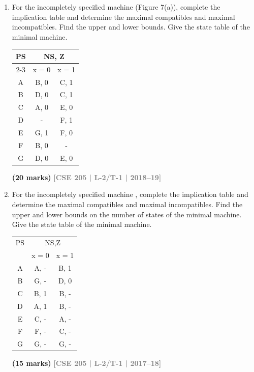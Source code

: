 \documentclass[12pt,a3paper]{article}
\newcommand{\yr}[1]{\hfill\textcolor{gray}{\small\textbf{[#1]}}}
\newcommand{\mk}[1]{\textcolor{orange!70!black}{\small\textbf{(#1 marks)}}}
\begin{document}
\begin{enumerate}
\mk{25} \yr{CSE 205 | L-2/T-1 | 2019--20}

\item For the incompletely specified machine (Figure 7(a)), complete the implication table and determine the maximal compatibles and maximal incompatibles. Find the upper and lower bounds. Give the state table of the minimal machine.

\begin{center}
  \begin{tabular}{|c|c|c|}
\hline
\multirow{2}{*}{PS} & \multicolumn{2}{c|}{NS, Z} \\ \cline{2-3} 
 & x = 0 & x = 1 \\ \hline
A & B, 0 & C, 1 \\ \hline
B & D, 0 & C, 1 \\ \hline
C & A, 0 & E, 0 \\ \hline
D & - & F, 1 \\ \hline
E & G, 1 & F, 0 \\ \hline
F & B, 0 & - \\ \hline
G & D, 0 & E, 0 \\ \hline
\end{tabular}
\end{center}

\mk{20} \yr{CSE 205 | L-2/T-1 | 2018--19}

\item For the incompletely specified machine , complete the implication table and determine the maximal compatibles and maximal incompatibles. Find the upper and lower bounds on the number of states of the minimal machine. Give the state table of the minimal machine.
\begin{center}
  \begin{tabular}{c|cc}
PS & \multicolumn{2}{c}{NS,Z} \\
 & x = 0 & x = 1 \\
\hline
A & A, - & B, 1 \\
B & G, - & D, 0 \\
C & B, 1 & B, - \\
D & A, 1 & B, - \\
E & C, - & A, - \\
F & F, - & C, - \\
G & G, - & G, - \\
\end{tabular}
\end{center}
  
\mk{15} \yr{CSE 205 | L-2/T-1 | 2017--18}

\end{enumerate}
\end{document}
